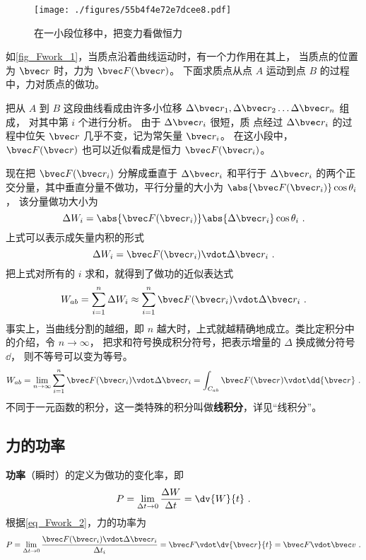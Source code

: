 

\begin{figure}[ht]
\centering
\texttt{[image: ./figures/55b4f4e72e7dcee8.pdf]}
\caption{在一小段位移中，把变力看做恒力}\label{fig_Fwork_1}
\end{figure}

如\autoref{fig_Fwork_1}，当质点沿着曲线运动时，有一个力作用在其上， 当质点的位置为 $\bvec r$ 时，力为 $\bvec F(\bvec r)$。 下面求质点从点 $A$ 运动到点 $B$ 的过程中，力对质点的做功。

把从 $A$ 到 $B$ 这段曲线看成由许多小位移 $\Delta \bvec r_1, \Delta \bvec r_2 \dots \Delta \bvec r_n$ 组成， 对其中第 $i$ 个进行分析。 由于 $\Delta \bvec r_i$ 很短，质
点经过 $\Delta \bvec r_i$ 的过程中位矢 $\bvec r$ 几乎不变，记为常矢量 $\bvec r_i$。 在这小段中，  $\bvec F(\bvec r)$ 也可以近似看成是恒力 $\bvec F(\bvec r_i)$。 

现在把 $\bvec F(\bvec r_i)$ 分解成垂直于 $\Delta \bvec r_i$ 和平行于 $\Delta \bvec r_i$ 的两个正交分量，其中垂直分量不做功，平行分量的大小为 $ \abs{\bvec F(\bvec r_i)} \cos \theta_i$， 该分量做功大小为
\begin{equation}
\Delta W_i = \abs{\bvec F(\bvec r_i)} \abs{\Delta \bvec r_i} \cos \theta_i~.
\end{equation}
上式可以表示成矢量内积的形式
\begin{equation}\label{eq_Fwork_2}
\Delta W_i = \bvec F(\bvec r_i) \vdot \Delta \bvec r_i~.
\end{equation}
把上式对所有的 $i$ 求和，就得到了做功的近似表达式
\begin{equation}
W_{ab} = \sum_{i = 1}^n \Delta W_i  \approx \sum_{i = 1}^n \bvec F(\bvec r_i) \vdot \Delta \bvec r_i ~.
\end{equation} 
事实上，当曲线分割的越细，即 $n$ 越大时，上式就越精确地成立。类比定积分中的介绍，令 $n \to \infty $， 把求和符号换成积分符号，把表示增量的 $\Delta $ 换成微分符号 $\dd{}$， 则不等号可以变为等号。
\begin{equation}\label{eq_Fwork_1}
W_{ab} = \lim_{n \to \infty } \sum_{i = 1}^n \bvec F(\bvec r_i) \vdot \Delta \bvec r_i  = \int_{C_{ab}} \bvec F(\bvec r) \vdot \dd{\bvec r}~.
\end{equation} 
不同于一元函数的积分，这一类特殊的积分叫做\textbf{线积分}，详见“线积分”。

\subsection{力的功率}
\textbf{功率}（瞬时）的定义为做功的变化率，即
\begin{equation}
P = \lim_{\Delta t\to 0} \frac{\Delta W}{\Delta t} = \dv{W}{t}~.
\end{equation}
根据\autoref{eq_Fwork_2}，力的功率为
\begin{equation}
P = \lim_{\Delta t\to 0} \frac{\bvec F(\bvec r_i)\vdot\Delta\bvec r_i}{\Delta t_i} = \bvec F \vdot\dv{\bvec r}{t} = \bvec F\vdot\bvec v~.
\end{equation}






